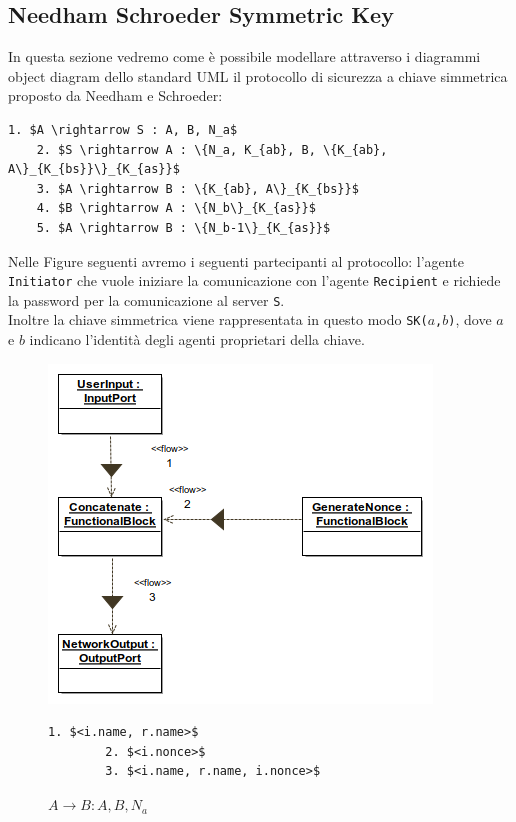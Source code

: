 \subsection{Needham Schroeder Symmetric Key}

In questa sezione vedremo come è possibile modellare attraverso i diagrammi object diagram dello standard UML il protocollo di sicurezza a chiave simmetrica proposto da Needham e Schroeder:
\begin{lstlisting}[mathescape]
    1. $A \rightarrow S : A, B, N_a$
    2. $S \rightarrow A : \{N_a, K_{ab}, B, \{K_{ab}, A\}_{K_{bs}}\}_{K_{as}}$
    3. $A \rightarrow B : \{K_{ab}, A\}_{K_{bs}}$
    4. $B \rightarrow A : \{N_b\}_{K_{as}}$
    5. $A \rightarrow B : \{N_b-1\}_{K_{as}}$
\end{lstlisting} 

\noindent Nelle Figure seguenti avremo i seguenti partecipanti al protocollo: l'agente \texttt{Initiator} che vuole iniziare la comunicazione con l'agente \texttt{Recipient} e richiede la password per la comunicazione al server \texttt{S}.\\
Inoltre la chiave simmetrica viene rappresentata in questo modo \texttt{SK($a$,$b$)}, dove $a$ e $b$ indicano l'identità degli agenti proprietari della chiave.\\
\newpage
\begin{figure}[h!] 
    \centering 
    \includegraphics[scale=0.6]{../img/NSSK/First_message(toServer)_Object_diagram.png} 
    \begin{lstlisting}[frame=single, mathescape, basicstyle=\footnotesize]
        1. $<i.name, r.name>$
        2. $<i.nonce>$
        3. $<i.name, r.name, i.nonce>$
    \end{lstlisting}
    \caption{$A \rightarrow B : A, B, N_a$} 
\end{figure}

